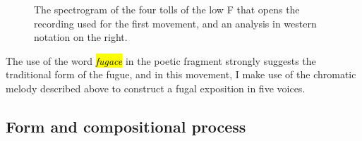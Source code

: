 \documentclass[12pt,twoside,maitrise]{dms_ks}
\theoremstyle{definition}
\begin{document}
{{\begin{figure}[h]
    \centering
    \caption{The spectrogram of the four tolls of the low F that opens the recording used for the first movement, and an analysis in western notation on the right.}
    \label{fig:cloche_analyse}
\end{figure}

The use of the word \hl{\textit{fugace}} in the poetic fragment strongly suggests the traditional form of the fugue, and in this movement, I make use of the chromatic melody described above to construct a fugal exposition in five voices.

\subsection{Form and compositional process}

}}
\end{document}
